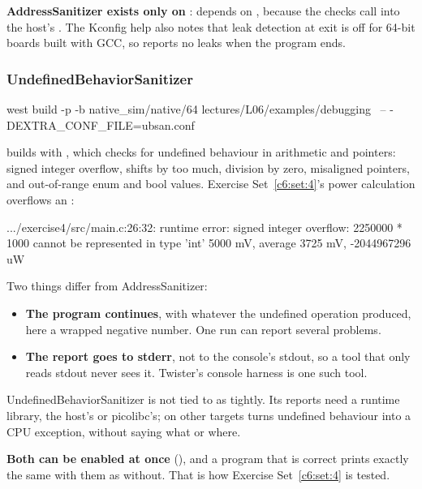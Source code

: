 \textbf{AddressSanitizer exists only on }:  depends on
, because the checks call into the host’s . The Kconfig help also
notes that leak detection at exit is off for 64-bit boards built with GCC, so
 reports no leaks when the program ends.

\subsubsection{UndefinedBehaviorSanitizer}
\begin{shell}
west build -p -b native_sim/native/64 lectures/L06/examples/debugging \
    -- -DEXTRA_CONF_FILE=ubsan.conf
\end{shell}

 builds with , which checks for undefined behaviour
in arithmetic and pointers: signed integer overflow, shifts by too much, division by zero,
misaligned pointers, and out-of-range enum and bool values. Exercise Set~\ref{c6:set:4}’s power
calculation overflows an \code{int32_t}:

\begin{console}
.../exercise4/src/main.c:26:32: runtime error: signed integer overflow: 2250000 * 1000 cannot be represented in type 'int'
5000 mV, average 3725 mV, -2044967296 uW
\end{console}

\noindent Two things differ from AddressSanitizer:

\begin{itemize}
  \item \textbf{The program continues}, with whatever the undefined operation produced, here a wrapped
    negative number. One run can report several problems.
  \item \textbf{The report goes to stderr}, not to the console’s stdout, so a tool that only reads stdout
    never sees it. Twister’s console harness is one such tool.
\end{itemize}

UndefinedBehaviorSanitizer is not tied to  as tightly. Its reports need a runtime
library, the host’s or picolibc’s; on other targets \code{CONFIG_UBSAN_TRAP} turns undefined
behaviour into a CPU exception, without saying what or where.

\textbf{Both can be enabled at once} (), and a program that
is correct prints exactly the same with them as without. That is how Exercise Set~\ref{c6:set:4} is
tested.

